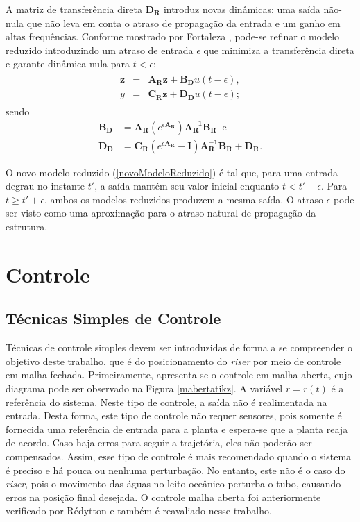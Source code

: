  A matriz de transferência direta $\mathbf{D_R}$ introduz novas dinâmicas: uma saída não-nula que não leva em conta o atraso de propagação da entrada e um ganho em altas frequências. Conforme mostrado por Fortaleza \cite{teseEugenio}, pode-se refinar o modelo reduzido introduzindo um atraso de entrada $\epsilon$ que minimiza a transferência direta e garante dinâmica nula para $t < \epsilon$: \begin{align}
\begin{array}{lll}
	\mathbf{\dot{z}} &=& \mathbf{A_R}\mathbf{z}+\mathbf{B_D}u(t-\epsilon),\\
	y &=& \mathbf{C_R}\mathbf{z}+\mathbf{D_D}u(t-\epsilon) \label{novoModeloReduzido};
\end{array}
\end{align} sendo \begin{align}
	\mathbf{B_D} &= \mathbf{A_R}\left(e^{\epsilon\mathbf{A_R}}\right)\mathbf{A_R^{-1}}\mathbf{B_R}\;\;\mathrm{e}\label{novoBD}\\
	\mathbf{D_D} &= \mathbf{C_R}\left(e^{\epsilon\mathbf{A_R}} - \mathbf{I}\right)\mathbf{A_R^{-1}}\mathbf{B_R} + \mathbf{D_R}\label{novoDD}.
\end{align}

 O novo modelo reduzido (\ref{novoModeloReduzido}) é tal que, para uma entrada degrau no instante $t'$, a saída mantém seu valor inicial enquanto $t < t' + \epsilon$. Para $t \ge t' + \epsilon$, ambos os modelos reduzidos produzem a mesma saída. O atraso $\epsilon$ pode ser visto como uma aproximação para o atraso natural de propagação da estrutura.

\section{Controle\label{controle}}
\subsection{Técnicas Simples de Controle} \label{SimpleControlSection}
 Técnicas de controle simples devem ser introduzidas de forma a se compreender o objetivo deste trabalho, que é do posicionamento do \textit{riser} por meio de controle em malha fechada. Primeiramente, apresenta-se o controle em malha aberta, cujo diagrama pode ser observado na Figura \ref{mabertatikz}. A variável $r = r(t)$ é a referência do sistema. Neste tipo de controle, a saída não é realimentada na entrada. Desta forma, este tipo de controle não requer sensores, pois somente é fornecida uma referência de entrada para a planta e espera-se que a planta reaja de acordo. Caso haja erros para seguir a trajetória, eles não poderão ser compensados. Assim, esse tipo de controle é mais recomendado quando o sistema é preciso e há pouca ou nenhuma perturbação. No entanto, este não é o caso do \textit{riser}, pois o movimento das águas no leito oceânico perturba o tubo, causando erros na posição final desejada. O controle malha aberta foi anteriormente verificado por Rédytton \cite{redytton} e também é reavaliado nesse trabalho.

